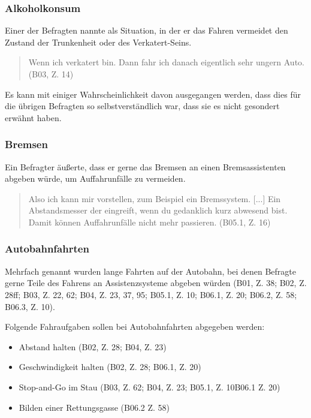 \documentclass[12pt]{article}
\begin{document}
\subsubsection*{Alkoholkonsum}
Einer der Befragten nannte als Situation, in der er das Fahren vermeidet den Zustand der Trunkenheit oder des Verkatert-Seins.

\begin{quote}
  Wenn ich verkatert bin. Dann fahr ich danach eigentlich sehr ungern Auto. (B03, Z. 14)
\end{quote}

Es kann mit einiger Wahrscheinlichkeit davon ausgegangen werden, dass dies für die übrigen Befragten so selbstverständlich war, dass sie es nicht gesondert erwähnt haben.

\subsubsection*{Bremsen}
Ein Befragter äußerte, dass er gerne das Bremsen an einen Bremsassistenten abgeben würde, um Auffahrunfälle zu vermeiden.

\begin{quote}
  Also ich kann mir vorstellen, zum Beispiel ein Bremssystem. [...] Ein Abstandsmesser der eingreift, wenn du gedanklich kurz abwesend bist. Damit können Auffahrunfälle nicht mehr passieren. (B05.1, Z. 16)
\end{quote}

\subsubsection*{Autobahnfahrten}
Mehrfach genannt wurden lange Fahrten auf der Autobahn, bei denen Befragte gerne Teile des Fahrens an Assistenzsysteme abgeben würden (B01, Z. 38; B02, Z. 28ff; B03, Z. 22, 62; B04, Z. 23, 37, 95; B05.1, Z. 10; B06.1, Z. 20; B06.2, Z. 58; B06.3, Z. 10).

Folgende Fahraufgaben sollen bei Autobahnfahrten abgegeben werden:
\begin{itemize}
  \item Abstand halten (B02, Z. 28; B04, Z. 23)
  \item Geschwindigkeit halten (B02, Z. 28; B06.1, Z. 20)
  \item Stop-and-Go im Stau (B03, Z. 62; B04, Z. 23; B05.1, Z. 10B06.1 Z. 20)
  \item Bilden einer Rettungsgasse (B06.2 Z. 58)
\end{itemize}
\end{document}
